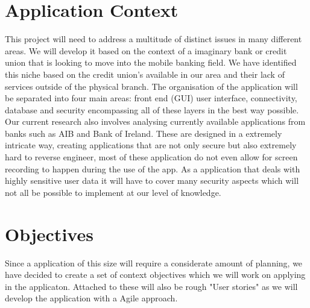 \section{Application Context}
    This project will need to address a multitude of distinct issues in many different areas. We will develop it based on the context of a imaginary bank or credit union that is looking to move into the mobile banking field. We have identified this niche based on the credit union's available in our area and their lack of services outside of the physical branch.
    The organisation of the application will be separated into four main areas: front end (GUI) user interface, connectivity, database and security encompassing all of these layers in the best way possible.
    Our current research also involves analysing currently available applications from banks such as AIB and Bank of Ireland. These are designed in a extremely intricate way, creating applications that are not only secure but also extremely hard to reverse engineer, most of these application do not even allow for screen recording to happen during the use of the app.
    As a application that deals with highly sensitive user data it will have to cover many security aspects which will not all be possible to implement at our level of knowledge.

\section{Objectives}
    Since a application of this size will require a considerate amount of planning, we have decided to create a set of context objectives which we will work on applying in the applicaton. Attached to these will also be rough "User stories" as we will develop the application with a Agile approach.\cite{userStories}
